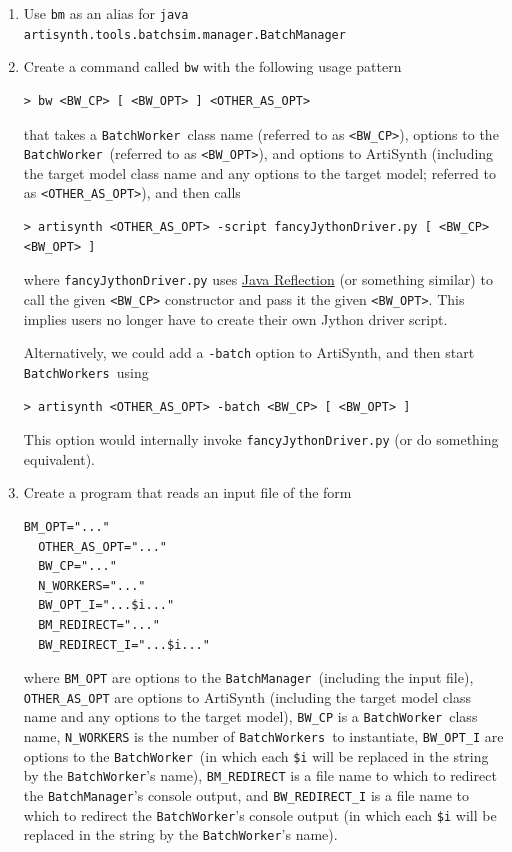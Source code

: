 \documentclass{article}
\newcommand{\BM}{{\tt BatchManager}}
\newcommand{\BW}{{\tt BatchWorker}}
\newcommand{\BWs}{{\tt BatchWorkers}}
\begin{document}
\begin{enumerate}

\item Use {\tt bm} as an alias for {\tt java artisynth.tools.batchsim.manager.BatchManager}

\item Create a command called {\tt bw} with the following usage pattern

\begin{lstlisting}[]
  > bw <BW_CP> [ <BW_OPT> ] <OTHER_AS_OPT> 
\end{lstlisting}

that takes a \BW\ class name (referred to as {\tt <BW\_CP>}), options to the \BW\ (referred to as {\tt <BW\_OPT>}), and options to ArtiSynth (including the target model class name and any options to the target model; referred to as {\tt <OTHER\_AS\_OPT>}), and then calls

\begin{lstlisting}[]
  > artisynth <OTHER_AS_OPT> -script fancyJythonDriver.py [ <BW_CP> <BW_OPT> ]
\end{lstlisting}

where {\tt fancyJythonDriver.py} uses \href{https://docs.oracle.com/javase/tutorial/reflect/index.html}{Java Reflection} (or something similar) to call the given {\tt <BW\_CP>} constructor and pass it the given {\tt <BW\_OPT>}. This implies users no longer have to create their own Jython driver script.

Alternatively, we could add a {\tt -batch} option to ArtiSynth, and then start \BWs\ using

\begin{lstlisting}[]
  > artisynth <OTHER_AS_OPT> -batch <BW_CP> [ <BW_OPT> ]
\end{lstlisting}

This option would internally invoke {\tt fancyJythonDriver.py} (or do something equivalent).

\item Create a program that reads an input file of the form

\begin{lstlisting}[]
  BM_OPT="..."
  OTHER_AS_OPT="..."
  BW_CP="..."
  N_WORKERS="..."
  BW_OPT_I="...$i..."
  BM_REDIRECT="..."
  BW_REDIRECT_I="...$i..."
\end{lstlisting}

where {\tt BM\_OPT} are options to the \BM\ (including the input file), {\tt OTHER\_AS\_OPT} are options to ArtiSynth (including the target model class name and any options to the target model), {\tt BW\_CP} is a \BW\ class name, {\tt N\_WORKERS} is the number of \BWs\ to instantiate, {\tt BW\_OPT\_I} are options to the \BW\ (in which each {\tt \$i} will be replaced in the string by the \BW's name), {\tt BM\_REDIRECT} is a file name to which to redirect the \BM's console output, and {\tt BW\_REDIRECT\_I} is a file name to which to redirect the \BW's console output (in which each {\tt \$i} will be replaced in the string by the \BW's name).


\end{enumerate}
\end{document}
